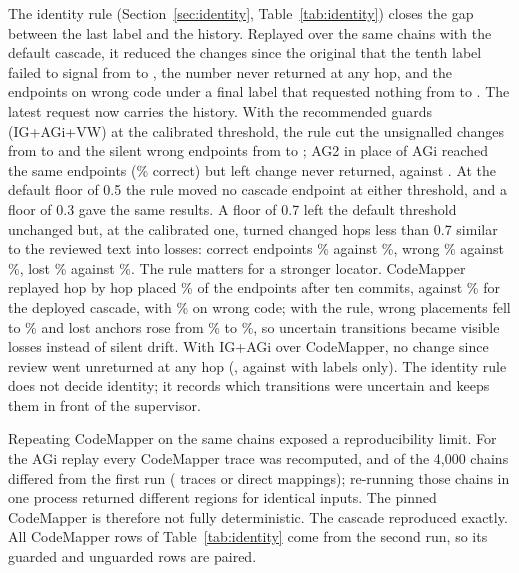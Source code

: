 The identity rule (Section~\ref{sec:identity}, Table~\ref{tab:identity}) closes the gap between the last label and the history. Replayed over the same chains with the default cascade, it reduced the changes since the original that the tenth label failed to signal from \wiChIOffMissLastTenK{} to \wiChIOffIdMissLastTenK{}, the number never returned at any hop, and the endpoints on wrong code under a final label that requested nothing from \wiChIOffSilentLastTenK{} to \wiChIOffIdSilentLastTenK{}. The latest request now carries the history. With the recommended guards (IG+AGi+VW) at the calibrated threshold, the rule cut the unsignalled changes from \wiChICaliMissLastTenK{} to \wiChICaliIdMissLastTenK{} and the silent wrong endpoints from \wiChICaliSilentLastTenK{} to \wiChICaliIdSilentLastTenK{}; AG2 in place of AGi reached the same endpoints (\wiChICaltwoAccTen\% correct) but left \wiChICaltwoMissCumTenK{} change never returned, against \wiChICaliMissCumTenK{}. At the default floor of 0.5 the rule moved no cascade endpoint at either threshold, and a floor of 0.3 gave the same results. A floor of 0.7 left the default threshold unchanged but, at the calibrated one, turned changed hops less than 0.7 similar to the reviewed text into losses: correct endpoints \wiChICaliIdHighAccTen\% against \wiChICaliIdAccTen\%, wrong \wiChICaliIdHighWrongTen\% against \wiChICaliIdWrongTen\%, lost \wiChICaliIdHighLostTen\% against \wiChICaliIdLostTen\%. The rule matters for a stronger locator. CodeMapper replayed hop by hop placed \wiChICmSeqAccTen\% of the endpoints after ten commits, against \wiChIOffAccTen\% for the deployed cascade, with \wiChICmSeqWrongTen\% on wrong code; with the rule, wrong placements fell to \wiChICmSeqIdWrongTen\% and lost anchors rose from \wiChICmSeqLostTen\% to \wiChICmSeqIdLostTen\%, so uncertain transitions became visible losses instead of silent drift. With IG+AGi over CodeMapper, no change since review went unreturned at any hop (\wiChICmSeqGiMissCumTenK{}, against \wiChICmSeqMissCumTenK{} with labels only). The identity rule does not decide identity; it records which transitions were uncertain and keeps them in front of the supervisor.

Repeating CodeMapper on the same chains exposed a reproducibility limit. For the AGi replay every CodeMapper trace was recomputed, and \wiChIGateChains{} of the 4,000 chains differed from the first run (\wiChIGateMismatches{} traces or direct mappings); re-running those chains in one process returned different regions for identical inputs. The pinned CodeMapper is therefore not fully deterministic. The cascade reproduced exactly. All CodeMapper rows of Table~\ref{tab:identity} come from the second run, so its guarded and unguarded rows are paired.

